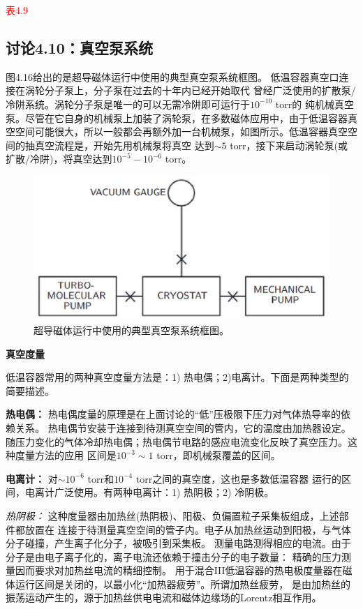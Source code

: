 \textcolor{red}{表4.9}


\subsection{讨论4.10：真空泵系统}

图4.16给出的是超导磁体运行中使用的典型真空泵系统框图。
低温容器真空口连接在涡轮分子泵上，分子泵在过去的十年内已经开始取代
曾经广泛使用的扩散泵/冷阱系统。涡轮分子泵是唯一的可以无需冷阱即可运行于$10^{−10}$ torr的
纯机械真空泵。尽管在它自身的机械泵上加装了涡轮泵，在多数磁体应用中，由于低温容器真空空间可能很大，所以一般都会再额外加一台机械泵，如图所示。低温容器真空空间的抽真空流程是，开始先用机械泵将真空
达到$\sim 5$ torr，接下来启动涡轮泵(或扩散/冷阱)，将真空达到$10^{-5}-10^{-6}$ torr。
\begin{figure}[htbp]
	\centering
	\includegraphics[scale=0.5]{chpt4/figs/fig4.16.eps}
	\caption{超导磁体运行中使用的典型真空泵系统框图。}
\end{figure}

\textbf{真空度量}

低温容器常用的两种真空度量方法是：1) 热电偶；2)电离计。下面是两种类型的简要描述。

\textbf{热电偶：} 热电偶度量的原理是在上面讨论的“低”压极限下压力对气体热导率的依赖关系。
热电偶节安装于连接到待测真空空间的管内，它的温度由加热器设定。
随压力变化的气体冷却热电偶；热电偶节电路的感应电流变化反映了真空压力。这种度量方法的应用
区间是$10^{-3}\sim 1$ torr，即机械泵覆盖的区间。

\textbf{电离计：} 对$\sim 10^{-6}$ torr和$10^{-4}$ torr之间的真空度，这也是多数低温容器
运行的区间，电离计广泛使用。有两种电离计：1) 热阴极；2) 冷阴极。

\textit{热阴极：} 这种度量器由加热丝(热阴极)、阳极、负偏置粒子采集板组成，上述部件都放置在
连接于待测量真空空间的管子内。电子从加热丝运动到阳极，与气体分子碰撞，产生离子化分子，被吸引到采集板。
测量电路测得相应的电流。由于分子是由电子离子化的，离子电流还依赖于撞击分子的电子数量：
精确的压力测量因而要求对加热丝电流的精细控制。
用于混合III低温容器的热电极度量器在磁体运行区间是关闭的，以最小化“加热器疲劳”。所谓加热丝疲劳，
是由加热丝的振荡运动产生的，源于加热丝供电电流和磁体边缘场的Lorentz相互作用。

